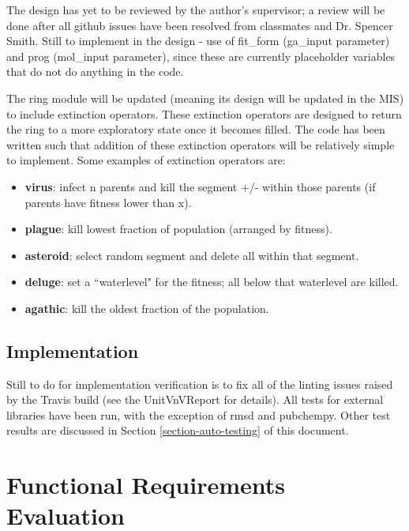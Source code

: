 \documentclass[12pt, titlepage]{article}
\begin{document}
The design has yet to be reviewed by the author's supervisor; a review will be 
done after all github issues have been resolved from classmates and Dr. Spencer 
Smith. Still to implement in the design - use of fit\_form (ga\_input 
parameter) and prog (mol\_input parameter), since these are currently 
placeholder variables that do not do anything in the code.

The ring module will be updated (meaning its design will be updated in the MIS) 
to include extinction operators. These extinction operators are designed to 
return the ring to a more exploratory state once it becomes filled. The code 
has been written such that addition of these extinction operators will be 
relatively simple to implement. Some examples of extinction operators are:

\begin{itemize}
	\item \textbf{virus}: infect n parents and kill the segment +/- within 
	those parents (if parents have fitness lower than x).
	\item \textbf{plague}: kill lowest fraction of population (arranged by 
	fitness).
	\item \textbf{asteroid}: select random segment and delete all within that 
	segment.
	\item \textbf{deluge}: set a ``waterlevel" for the fitness; all below that 
	waterlevel are killed.
	\item \textbf{agathic}:	kill the oldest fraction of the population.
	
\end{itemize}

\subsection{Implementation}

Still to do for implementation verification is to fix all of the linting issues 
raised by the Travis build (see the UnitVnVReport for details). All tests for 
external libraries have been run, with the exception of rmsd and pubchempy. 
Other test results are discussed in Section \ref{section-auto-testing} of this 
document.

\section{Functional Requirements Evaluation}
\end{document}
